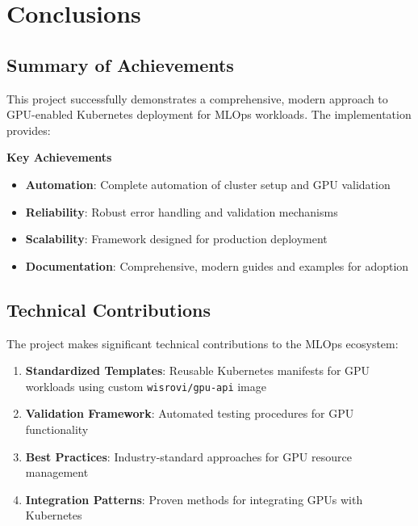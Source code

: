 \documentclass[12pt,a4paper]{report}
\begin{document}
\chapter{Conclusions}
\label{chap:conclusions}

\section{Summary of Achievements}
This project successfully demonstrates a comprehensive, modern approach to GPU-enabled Kubernetes deployment for MLOps workloads. The implementation provides:

\begin{center}
\colorbox{primarycolor}{
    \color{white}\textbf{Key Achievements}
}
\end{center}

\vspace{0.3cm}

\begin{itemize}
    \item \textcolor{primarycolor}{\textbullet} \textbf{Automation}: Complete automation of cluster setup and GPU validation
    \item \textcolor{primarycolor}{\textbullet} \textbf{Reliability}: Robust error handling and validation mechanisms
    \item \textcolor{primarycolor}{\textbullet} \textbf{Scalability}: Framework designed for production deployment
    \item \textcolor{primarycolor}{\textbullet} \textbf{Documentation}: Comprehensive, modern guides and examples for adoption
\end{itemize}

\section{Technical Contributions}
The project makes significant technical contributions to the MLOps ecosystem:

\begin{enumerate}
    \item \textbf{Standardized Templates}: Reusable Kubernetes manifests for GPU workloads using custom \texttt{wisrovi/gpu-api} image
    \item \textbf{Validation Framework}: Automated testing procedures for GPU functionality
    \item \textbf{Best Practices}: Industry-standard approaches for GPU resource management
    \item \textbf{Integration Patterns}: Proven methods for integrating GPUs with Kubernetes
\end{enumerate}
\end{document}
